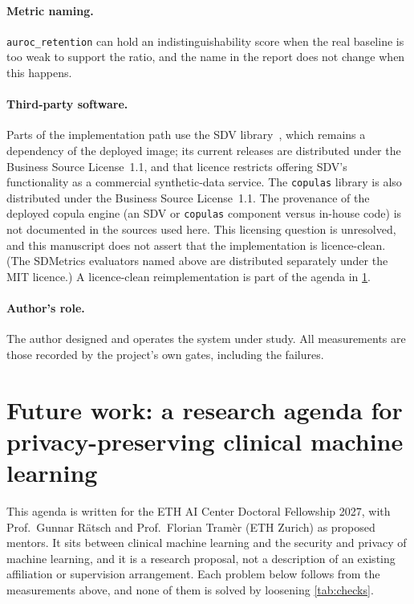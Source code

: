 \documentclass[11pt,a4paper]{article}
\begin{document}
\paragraph{Metric naming.} \texttt{auroc\_retention} can hold an indistinguishability score when the real baseline is too weak to support the ratio, and the name in the report does not change when this happens.

\paragraph{Third-party software.} Parts of the implementation path use the SDV library~\cite{patki2016}, which remains a dependency of the deployed image; its current releases are distributed under the Business Source License~1.1, and that licence restricts offering SDV's functionality as a commercial synthetic-data service. The \texttt{copulas} library is also distributed under the Business Source License~1.1. The provenance of the deployed copula engine (an SDV or \texttt{copulas} component versus in-house code) is not documented in the sources used here. This licensing question is unresolved, and this manuscript does not assert that the implementation is licence-clean. (The SDMetrics evaluators named above are distributed separately under the MIT licence.) A licence-clean reimplementation is part of the agenda in \cref{sec:agenda}.

\paragraph{Author's role.} The author designed and operates the system under study. All measurements are those recorded by the project's own gates, including the failures.

\section{Future work: a research agenda for privacy-preserving clinical machine learning}\label{sec:agenda}

This agenda is written for the ETH AI Center Doctoral Fellowship 2027, with Prof.\ Gunnar Rätsch and Prof.\ Florian Tramèr (ETH Zurich) as proposed mentors. It sits between clinical machine learning and the security and privacy of machine learning, and it is a research proposal, not a description of an existing affiliation or supervision arrangement. Each problem below follows from the measurements above, and none of them is solved by loosening \cref{tab:checks}.
\end{document}
